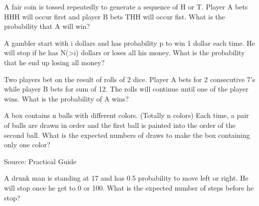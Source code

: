 \begin{exe}
A fair coin is tossed repeatedly to generate a sequence of H or T. Player A bets HHH will occur first and player B bets THH will occur fist. What is the probability that A will win?
\end{exe}
\begin{teacher}
\begin{sol}
\end{sol}
\end{teacher}

\begin{exe}
A gambler start with i dollars and has probability p to win 1 dollar each time. He will stop if he has N(>i) dollars or loses all his money. What is the probability that he end up losing all money?
\end{exe}
\begin{teacher}
\begin{sol}
\end{sol}
\end{teacher}

\begin{exe}
Two players bet on the result of rolls of 2 dice. Player A bets for 2 consecutive 7's while player B bets for sum of 12. The rolls will continue until one of the player wins. What is the probability of A wins?
\end{exe}
\begin{teacher}
\begin{sol}
\end{sol}
\end{teacher}

\begin{exe}
A box contains n balls with different colors. (Totally n colors) Each time, a pair of balls are drawn in order and the first ball is painted into the order of the second ball. What is the expected numbers of draws to make the box containing only one color?
\end{exe}
Source: Practical Guide
\begin{teacher}
\begin{sol}
\end{sol}
\end{teacher}

\begin{exe}
A drunk man is standing at 17 and has 0.5 probability to move left or right. He will stop once he get to 0 or 100. What is the expected number of steps before he stop?
\end{exe}
\begin{teacher}
\begin{sol}
\end{sol}
\end{teacher}


